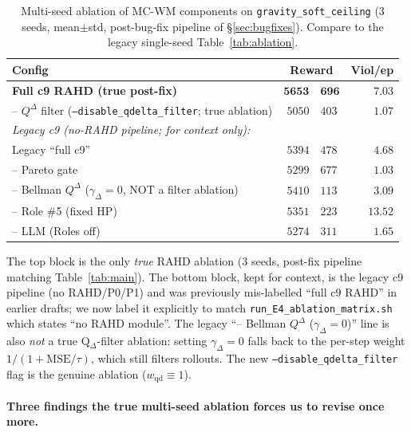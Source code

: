 \documentclass{article}
\theoremstyle{definition}
\newcommand{\QD}{Q^{\Delta}}
\begin{document}
\begin{table}[h]
\caption{Multi-seed ablation of MC-WM components on
\texttt{gravity\_soft\_ceiling} (3 seeds, mean$\pm$std, post-bug-fix
pipeline of \S\ref{sec:bugfixes}).  Compare to the legacy single-seed
Table~\ref{tab:ablation}.}
\label{tab:ablation-multi}
\centering
\small
\begin{tabular}{lr@{$\,\pm\,$}lr}
\toprule
Config                                                & \multicolumn{2}{c}{Reward} & Viol/ep \\
\midrule
\textbf{Full c9 RAHD (true post-fix)}                 & $\mathbf{5653}$ & $\mathbf{696}$ & $7.03$ \\
\quad -- $\QD$ filter (\texttt{--disable\_qdelta\_filter}; true ablation) & $5050$          & $403$          & $1.07$ \\
\midrule
\textit{Legacy c9 (no-RAHD pipeline; for context only):} \\
\quad Legacy ``full c9''                              & $5394$          & $478$          & $4.68$ \\
\quad -- Pareto gate                                  & $5299$          & $677$          & $1.03$ \\
\quad -- Bellman $\QD$ ($\gamma_\Delta=0$, NOT a filter ablation) & $5410$ & $113$       & $3.09$ \\
\quad -- Role \#5 (fixed HP)                          & $5351$          & $223$          & $13.52$ \\
\quad -- LLM (Roles off)                              & $5274$          & $311$          & $1.65$ \\
\bottomrule
\end{tabular}
\par\smallskip
\footnotesize
The top block is the only \emph{true} RAHD ablation (3 seeds, post-fix
pipeline matching Table~\ref{tab:main}).  The bottom block, kept for
context, is the legacy c9 pipeline (no RAHD/P0/P1) and was previously
mis-labelled ``full c9 RAHD'' in earlier drafts; we now label it
explicitly to match \texttt{run\_E4\_ablation\_matrix.sh} which states
``no RAHD module''.  The legacy ``-- Bellman $\QD$ ($\gamma_\Delta=0$)''
line is also \emph{not} a true Q$_\Delta$-filter ablation: setting
$\gamma_\Delta=0$ falls back to the per-step weight $1/(1+\mathrm{MSE}/\tau)$,
which still filters rollouts.  The new
\texttt{--disable\_qdelta\_filter} flag is the genuine ablation
($w_{\mathrm{qd}}\!\equiv\!1$).
\end{table}

\paragraph{Three findings the true multi-seed ablation forces us to
revise once more.}
\end{document}
